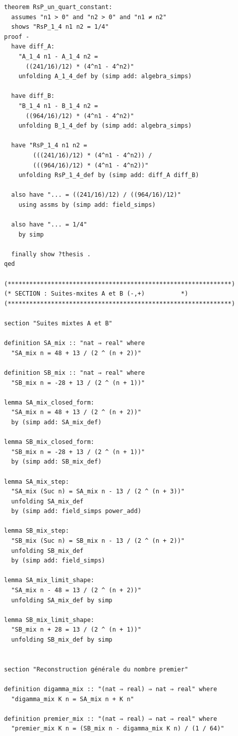 \documentclass[a4paper,11pt]{article}
\begin{document}
\begin{holcode}[title={\textcolor{white}{Fichier : methode\_spectral.thy -- Partie 1/4}}]
\begin{lstlisting}
theorem RsP_un_quart_constant:
  assumes "n1 > 0" and "n2 > 0" and "n1 ≠ n2"
  shows "RsP_1_4 n1 n2 = 1/4"
proof -
  have diff_A:
    "A_1_4 n1 - A_1_4 n2 =
      ((241/16)/12) * (4^n1 - 4^n2)"
    unfolding A_1_4_def by (simp add: algebra_simps)

  have diff_B:
    "B_1_4 n1 - B_1_4 n2 =
      ((964/16)/12) * (4^n1 - 4^n2)"
    unfolding B_1_4_def by (simp add: algebra_simps)

  have "RsP_1_4 n1 n2 =
        (((241/16)/12) * (4^n1 - 4^n2)) /
        (((964/16)/12) * (4^n1 - 4^n2))"
    unfolding RsP_1_4_def by (simp add: diff_A diff_B)

  also have "... = ((241/16)/12) / ((964/16)/12)"
    using assms by (simp add: field_simps)

  also have "... = 1/4"
    by simp

  finally show ?thesis .
qed

(**************************************************************)
(* SECTION : Suites-mxites A et B (-,+)          *)
(**************************************************************)

section "Suites mixtes A et B"

definition SA_mix :: "nat ⇒ real" where
  "SA_mix n = 48 + 13 / (2 ^ (n + 2))"

definition SB_mix :: "nat ⇒ real" where
  "SB_mix n = -28 + 13 / (2 ^ (n + 1))"

lemma SA_mix_closed_form:
  "SA_mix n = 48 + 13 / (2 ^ (n + 2))"
  by (simp add: SA_mix_def)

lemma SB_mix_closed_form:
  "SB_mix n = -28 + 13 / (2 ^ (n + 1))"
  by (simp add: SB_mix_def)

lemma SA_mix_step:
  "SA_mix (Suc n) = SA_mix n - 13 / (2 ^ (n + 3))"
  unfolding SA_mix_def
  by (simp add: field_simps power_add)

lemma SB_mix_step:
  "SB_mix (Suc n) = SB_mix n - 13 / (2 ^ (n + 2))"
  unfolding SB_mix_def
  by (simp add: field_simps)

lemma SA_mix_limit_shape:
  "SA_mix n - 48 = 13 / (2 ^ (n + 2))"
  unfolding SA_mix_def by simp

lemma SB_mix_limit_shape:
  "SB_mix n + 28 = 13 / (2 ^ (n + 1))"
  unfolding SB_mix_def by simp


section "Reconstruction générale du nombre premier"

definition digamma_mix :: "(nat ⇒ real) ⇒ nat ⇒ real" where
  "digamma_mix K n = SA_mix n + K n"

definition premier_mix :: "(nat ⇒ real) ⇒ nat ⇒ real" where
  "premier_mix K n = (SB_mix n - digamma_mix K n) / (1 / 64)"


\end{lstlisting}
\end{holcode}
\end{document}
